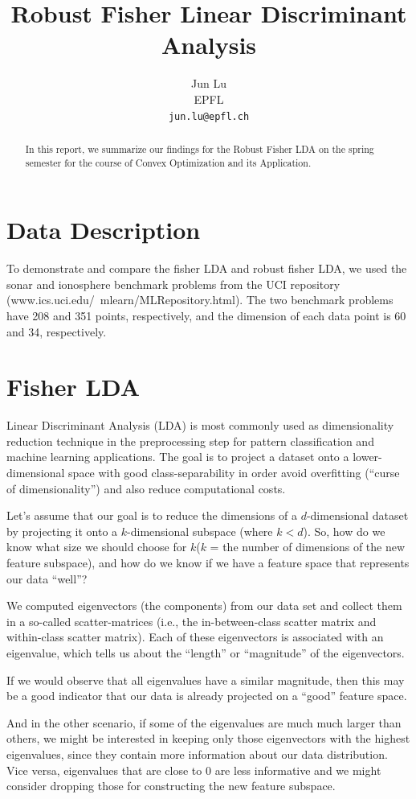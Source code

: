 \documentclass{article} %
\title{Robust Fisher Linear Discriminant Analysis}
\author{
Jun Lu\\
EPFL \\
\texttt{jun.lu@epfl.ch} \\
}
\begin{document}
\maketitle

\begin{abstract}
In this report, we summarize our findings for the Robust Fisher LDA on the spring semester for the course of Convex Optimization and its Application.
\end{abstract}

\section{Data Description}
To demonstrate and compare the fisher LDA and robust fisher LDA, we used the sonar and ionosphere benchmark problems from the UCI repository (www.ics.uci.edu/~mlearn/MLRepository.html). The two benchmark problems have 208 and 351 points, respectively, and the dimension of each data point is 60 and 34, respectively.

\section{Fisher LDA}
Linear Discriminant Analysis (LDA) is most commonly used as dimensionality reduction technique in the preprocessing step for pattern classification and machine learning applications. The goal is to project a dataset onto a lower-dimensional space with good class-separability in order avoid overfitting (“curse of dimensionality”) and also reduce computational costs.

Let’s assume that our goal is to reduce the dimensions of a $d$-dimensional dataset by projecting it onto a $k$-dimensional subspace (where $k<d$). So, how do we know what size we should choose for $k$($k$ = the number of dimensions of the new feature subspace), and how do we know if we have a feature space that represents our data “well”?


We computed eigenvectors (the components) from our data set and collect them in a so-called scatter-matrices (i.e., the in-between-class scatter matrix and within-class scatter matrix).
Each of these eigenvectors is associated with an eigenvalue, which tells us about the “length” or “magnitude” of the eigenvectors.

If we would observe that all eigenvalues have a similar magnitude, then this may be a good indicator that our data is already projected on a “good” feature space.

And in the other scenario, if some of the eigenvalues are much much larger than others, we might be interested in keeping only those eigenvectors with the highest eigenvalues, since they contain more information about our data distribution. Vice versa, eigenvalues that are close to 0 are less informative and we might consider dropping those for constructing the new feature subspace.
\end{document}
